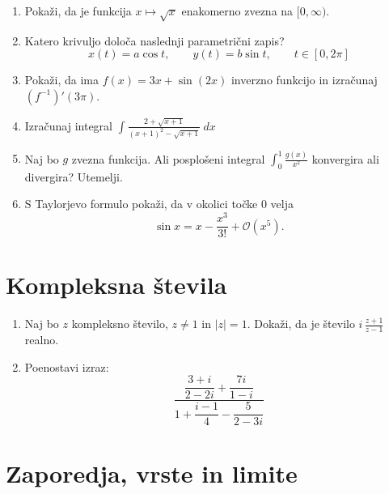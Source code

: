 \documentclass[a4paper,12pt]{article}
\begin{document}
\begin{enumerate}
\item
Pokaži, da je funkcija \(x \mapsto \sqrt{x}\) enakomerno zvezna na \([0,\infty).\)

\item
Katero krivuljo določa naslednji parametrični zapis?
\[
x(t) = a \cos t, \qquad %
y(t) = b \sin t, \qquad %
t \in [0, 2 \pi]
\]

\item
Pokaži, da ima \(f(x) = 3x + \sin (2x)\) inverzno funkcijo in izračunaj \((f^{-1})'(3 \pi).\)

\item
Izračunaj integral
\(\displaystyle \int \frac{2+\sqrt{x+1}}{(x+1)^2-\sqrt{x+1}}\ dx\)

\item
Naj bo \(g\) zvezna funkcija. Ali posplošeni integral
\(\int_0^1 \frac{g(x)}{x^2}\)
konvergira ali divergira? Utemelji.

\item
S Taylorjevo formulo pokaži, da v okolici točke \(0\) velja
\[\sin x = x - \frac{x^3}{3!} + \mathcal{O}(x^5).\]
\end{enumerate}

\section*{Kompleksna števila}

\begin{enumerate}
\item
Naj bo \(z\) kompleksno število, \(z \ne 1\) in \(\vert z \vert = 1.\)
Dokaži, da je število \( i \, \frac{z+1}{z-1} \) realno.

\item
Poenostavi izraz:
\[\frac{\dfrac{3 + i}{2-2i}+ \dfrac{7i}{1-i}}{1+ \dfrac{i-1}{4} - \dfrac{5}{2-3i}}\]
\end{enumerate}

\section*{Zaporedja, vrste in limite}
\end{document}
